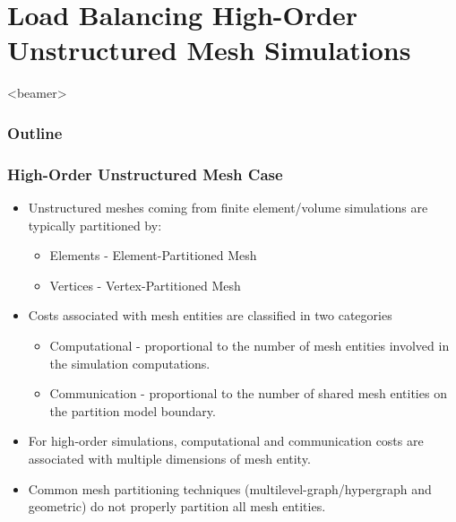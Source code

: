 \documentclass[aspectratio=169]{beamer}
\newcommand{\outline}{
  \begin{frame}<beamer>
    \frametitle{Outline}
    \tableofcontents[currentsection]
  \end{frame}
}
\begin{document}
\section{Load Balancing High-Order Unstructured Mesh Simulations}
\outline

\begin{frame}
  \frametitle{High-Order Unstructured Mesh Case}
  \begin{itemize}
  \item Unstructured meshes coming from finite element/volume simulations are typically partitioned by:
    \begin{itemize}
    \item Elements - Element-Partitioned Mesh
    \item Vertices - Vertex-Partitioned Mesh
    \end{itemize}
  \item Costs associated with mesh entities are classified in two categories
    \begin{itemize}
    \item Computational - proportional to the number of mesh entities involved in the simulation computations.
    \item Communication - proportional to the number of shared mesh entities on the partition model boundary.
    \end{itemize}
  \item For high-order simulations, computational and communication costs are associated with multiple dimensions of mesh entity.
    \item Common mesh partitioning techniques (multilevel-graph/hypergraph and geometric) do not properly partition all mesh entities.
  \end{itemize}
\end{frame}
\end{document}
